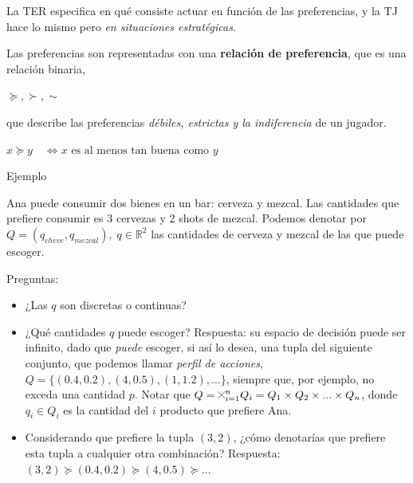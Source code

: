\documentclass[12pt]{scrartcl}
\theoremstyle{definition}
\newcommand{\Cross}{\mathbin{\tikz [x=1.4ex,y=1.4ex,line width=.1ex] \draw (0,0) -- (1,1) (0,1) -- (1,0);}}%
\begin{document}
La TER especifica en qué consiste actuar en función de las preferencias, y la TJ hace lo mismo pero \textit{en situaciones estratégicas}. 

Las preferencias son representadas con una \textbf{relación de preferencia}, que es una relación binaria,
\begin{center}
    $\succeq, \succ, \sim$
\end{center}
que describe las preferencias \textit{débiles, estrictas y la indiferencia} de un jugador.

\begin{center}
    $x \succeq y\quad \Longleftrightarrow x \text{ es al menos tan buena como } y$
\end{center}

\begin{exbox}{Ejemplo}

Ana puede consumir dos bienes en un bar: cerveza y mezcal. Las cantidades que prefiere consumir es 3 cervezas y 2 shots de mezcal. Podemos denotar por $Q=(q_{cheve}, q_{mezcal}),\; q \in \mathbb{R}^2$ las cantidades de cerveza y mezcal de las que puede escoger. 

Preguntas: 

\begin{itemize}
    \item ¿Las $q$ son discretas o continuas?
    \item ¿Qué cantidades $q$ puede escoger? Respuesta: su espacio de decisión puede ser infinito, dado que \textit{puede} escoger, si así lo desea, una tupla del siguiente conjunto, que podemos llamar \textit{perfil de acciones}, $Q=\{(0.4, 0.2), (4, 0.5), (1, 1.2), ...\}$, siempre que, por ejemplo, no exceda una cantidad $p$. Notar que $Q=\Cross_{i=1}^n Q_i = Q_1 \times Q_2 \times ... \times Q_n$, donde $q_i \in Q_i$ es la cantidad del $i$ producto que prefiere Ana.
    \item Considerando que prefiere la tupla $(3, 2)$, ¿cómo denotarías que prefiere esta tupla a cualquier otra combinación? Respuesta: $(3, 2) \succeq (0.4, 0.2) \succeq (4, 0.5) \succeq ...$
\end{itemize}
\end{exbox}
\end{document}
